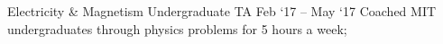 \experience
    {Electricity \& Magnetism}
    {Undergraduate TA}
    {Feb `17 -- May `17}
    {
        Coached MIT undergraduates through physics problems for 5 hours a week;
    }

